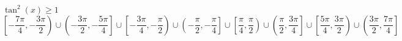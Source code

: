 { $\tan^{2} \left( x \right) \geq 1$}
{$\left[ -\dfrac{7\pi}{4}, -\dfrac{3\pi}{2} \right) \cup \left( -\dfrac{3\pi}{2}, -\dfrac{5\pi}{4} \right] \cup \left[ -\dfrac{3\pi}{4}, -\dfrac{\pi}{2} \right) \cup \left( -\dfrac{\pi}{2}, -\dfrac{\pi}{4} \right] \cup \left[ \dfrac{\pi}{4}, \dfrac{\pi}{2} \right) \cup \left( \dfrac{\pi}{2}, \dfrac{3\pi}{4} \right] \cup \left[ \dfrac{5\pi}{4}, \dfrac{3\pi}{2} \right) \cup \left( \dfrac{3\pi}{2}, \dfrac{7\pi}{4} \right]$}
